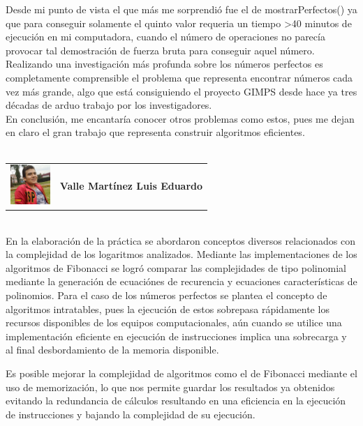 \documentclass{report}
\begin{document}
    Desde mi punto de vista el que más me sorprendió fue el de mostrarPerfectos() ya que para conseguir solamente el quinto valor requeria un tiempo >40 minutos de ejecución en mi computadora, cuando el número de operaciones no parecía provocar tal demostración de fuerza bruta para conseguir aquel número. Realizando una investigación más profunda sobre los números perfectos es completamente comprensible el problema que representa encontrar números cada vez más grande, algo que está consiguiendo el proyecto GIMPS desde hace ya tres décadas de arduo trabajo por los investigadores.\\
    
    En conclusión, me encantaría conocer otros problemas como estos, pues me dejan en claro el gran trabajo que representa construir algoritmos eficientes.\\\\
    \begin{tabular}{l l}
        \multirow{3}{*}{\includegraphics[width=1.5cm]{Imagenes/lalo.jpg}}  &  \\
        & \textbf{Valle Mart\'inez Luis Eduardo} \\
        & \\
    \end{tabular}
    \vspace*{3\baselineskip}\\
    En la elaboración de la práctica se abordaron conceptos diversos relacionados con la complejidad de los logaritmos analizados. Mediante las implementaciones de los algoritmos de Fibonacci se logró comparar las complejidades de tipo polinomial mediante la generación de ecuaciónes de recurencia y ecuaciones características de polinomios.
    Para el caso de los números perfectos se plantea el concepto de algoritmos intratables, pues la ejecución de estos sobrepasa rápidamente los recursos disponibles de los equipos computacionales, aún cuando se utilice una implementación eficiente en ejecución de instrucciones implica una sobrecarga y al final desbordamiento de la memoria disponible.
    
    Es posible mejorar la complejidad de algoritmos como el de Fibonacci mediante el uso de memorización, lo que nos permite guardar los resultados ya obtenidos evitando la redundancia de cálculos resultando en una eficiencia en la ejecución de instrucciones y bajando la complejidad de su ejecución.
    
\end{document}
